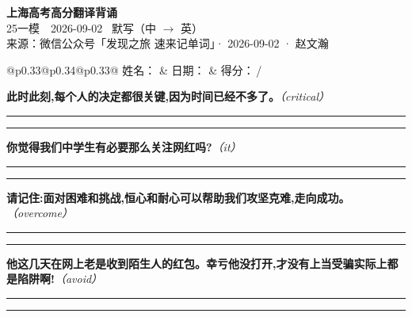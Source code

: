 \documentclass[11pt,a4paper]{article}
\newcommand{\num}[1]{\makebox[1.9em][r]{#1.}\hspace{0.3em}}
\newcommand{\wline}{\noindent\rule{\linewidth}{0.4pt}}
\newcommand{\prompt}[1]{\emph{\textcolor{tipblue}{\small（#1）}}}
\begin{document}
\pagestyle{plain}
\begin{center}
{\LARGE\bfseries 上海高考高分翻译背诵 }\\[0.25em]
{\large 25一模　2026-09-02 \quad\ 默写（中 $\to$ 英）}\\[0.35em]
{\footnotesize 来源：微信公众号「发现之旅 速来记单词」· 2026-09-02 · 赵文瀚}
\end{center}

\vspace{0.4em}
\noindent\begin{tabular}{@{}p{0.33\textwidth}@{}p{0.34\textwidth}@{}p{0.33\textwidth}@{}}
姓名：\underline{\hspace{2.0cm}} & 日期：\underline{\hspace{2.0cm}} & 得分：\underline{\hspace{1.4cm}}\,/ \\
\end{tabular}

\vspace{0.5em}

\vspace{0.8em}
\num{1}\textbf{此时此刻,每个人的决定都很关键,因为时间已经不多了。}\prompt{critical}

\vspace{0.3em}

\wline\vspace{0.3em}
\wline

\num{2}\textbf{你觉得我们中学生有必要那么关注网红吗?}\prompt{it}

\vspace{0.3em}

\wline\vspace{0.3em}
\wline

\num{3}\textbf{请记住:面对困难和挑战,恒心和耐心可以帮助我们攻坚克难,走向成功。}\prompt{overcome}

\vspace{0.3em}

\wline\vspace{0.3em}
\wline

\num{4}\textbf{他这几天在网上老是收到陌生人的红包。幸亏他没打开,才没有上当受骗实际上都是陷阱啊!}\prompt{avoid}

\vspace{0.3em}

\wline\vspace{0.3em}
\wline
\end{document}
